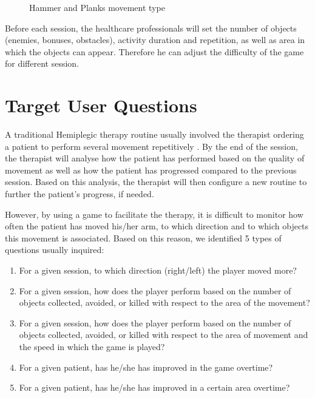 
\begin{figure}%
    \centering
    \qquad
    \caption{Hammer and Planks movement type}%
    \label{fig:movement_type}%
\end{figure}


Before each session, the healthcare professionals will set the number of objects (enemies, bonuses, obstacles), activity duration and repetition, as well as area in which the objects can appear. Therefore he can adjust the difficulty of the game for different session.


\section{Target User Questions}

A traditional Hemiplegic therapy routine usually involved the therapist ordering a patient to perform several movement repetitively \cite{rahman}. By the end of the session, the therapist will analyse how the patient has performed based on the quality of movement as well as how the patient has progressed compared to the previous session. Based on this analysis, the therapist will then configure a new routine to further the patient's progress, if needed.

However, by using a game to facilitate the therapy, it is difficult to monitor how often the patient has moved his/her arm, to which direction and to which objects this movement is associated. Based on this reason, we identified 5 types of questions usually inquired:

\newcommand{\subscript}[2]{$#1 _ #2$}	
\begin{enumerate}[label=(\subscript{Q}{\arabic*})]
\item For a given session, to which direction (right/left) the player moved more? \label{q1}
\item For a given session, how does the player perform based on the number of objects collected, avoided, or killed with respect to the area of the movement?\label{q2}
\item For a given session, how does the player perform based on the number of objects collected, avoided, or killed with respect to the area of movement and the speed in which the game is played?\label{q3}
\item For a given patient, has he/she has improved in the game overtime?\label{q4}
\item For a given patient, has he/she has improved in a certain area overtime?\label{q5}
\end{enumerate}

